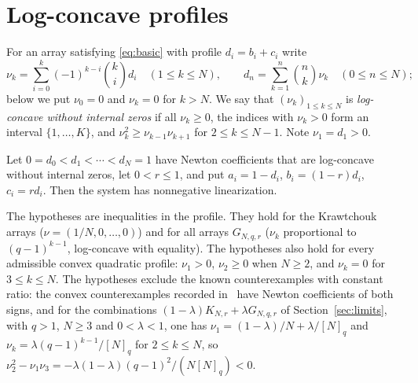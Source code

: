 \section{Log-concave profiles}\label{sec:lc}

For an array satisfying \eqref{eq:basic} with profile $d_i=b_i+c_i$ write
\[
\nu_k=\sum_{i=0}^k(-1)^{k-i}\binom ki d_i\quad(1\leq k\leq N),\qquad d_n=\sum_{k=1}^n\binom nk\nu_k\quad(0\leq n\leq N);
\]
below we put $\nu_0=0$ and $\nu_k=0$ for $k>N$.
We say that $(\nu_k)_{1\leq k\leq N}$ is \emph{log-concave without internal zeros} if all $\nu_k\geq0$, the indices with $\nu_k>0$ form an interval $\{1,\ldots,K\}$, and $\nu_k^2\geq\nu_{k-1}\nu_{k+1}$ for $2\leq k\leq N-1$. Note $\nu_1=d_1>0$.

\begin{theorem}\label{thm:lc}
Let $0=d_0<d_1<\cdots<d_N=1$ have Newton coefficients that are log-concave without internal zeros, let $0<r\leq1$, and put $a_i=1-d_i$, $b_i=(1-r)d_i$, $c_i=rd_i$. Then the system has nonnegative linearization.
\end{theorem}

The hypotheses are inequalities in the profile. They hold for the Krawtchouk arrays ($\nu=(1/N,0,\ldots,0)$) and for all arrays $G_{N,q,r}$ ($\nu_k$ proportional to $(q-1)^{k-1}$, log-concave with equality). The hypotheses also hold for every admissible convex quadratic profile: $\nu_1>0$, $\nu_2\geq0$ when $N\geq2$, and $\nu_k=0$ for $3\leq k\leq N$. The hypotheses exclude the known counterexamples with constant ratio: the convex counterexamples recorded in~\cite{P3} have Newton coefficients of both signs, and for the combinations $(1-\lambda)K_{N,r}+\lambda G_{N,q,r}$ of Section~\ref{sec:limits}, with $q>1$, $N\geq3$ and $0<\lambda<1$, one has $\nu_1=(1-\lambda)/N+\lambda/[N]_q$ and $\nu_k=\lambda(q-1)^{k-1}/[N]_q$ for $2\leq k\leq N$, so $\nu_2^2-\nu_1\nu_3=-\lambda(1-\lambda)(q-1)^2/(N[N]_q)<0$.

\medskip
\noindent{}
\medskip

